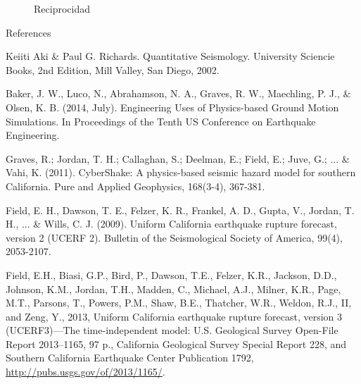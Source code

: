 \documentclass{beamer}
\begin{document}
\begin{frame}[allowframebreaks]
%
\begin{figure}[h]
\centering
	\qquad
\caption{Reciprocidad}
%
\end{figure}
%
%
\end{frame}
%
%
\begin{frame}[allowframebreaks]{References}
\def\newblock{}
%
%

\begin{thebibliography}{1}

 Keiiti Aki \& Paul G. Richards. {Q}uantitative {S}eismology. University Sciencie Books, 2nd Edition, Mill Valley, San Diego, 2002.

 Baker, J. W., Luco, N., Abrahamson, N. A., Graves, R. W., Maechling, P. J., \& Olsen, K. B. (2014, July). Engineering Uses of Physics-based Ground Motion Simulations. In Proceedings of the Tenth US Conference on Earthquake Engineering.

 Graves, R.; Jordan, T. H.; Callaghan, S.; Deelman, E.; Field, E.; Juve, G.; ... \& Vahi, K. (2011). CyberShake: A physics-based seismic hazard model for southern California. Pure and Applied Geophysics, 168(3-4), 367-381.

 Field, E. H., Dawson, T. E., Felzer, K. R., Frankel, A. D., Gupta, V., Jordan, T. H., ... \& Wills, C. J. (2009). Uniform California earthquake rupture forecast, version 2 (UCERF 2). Bulletin of the Seismological Society of America, 99(4), 2053-2107.

 Field, E.H., Biasi, G.P., Bird, P., Dawson, T.E., Felzer, K.R., Jackson, D.D., Johnson, K.M., Jordan, T.H., Madden, C., Michael, A.J., Milner, K.R., Page, M.T., Parsons, T., Powers, P.M., Shaw, B.E., Thatcher, W.R., Weldon, R.J., II, and Zeng, Y., 2013, Uniform California earthquake rupture forecast, version 3 (UCERF3)—The time-independent model: U.S. Geological Survey Open-File Report 2013–1165, 97 p., California Geological Survey Special Report 228, and Southern California Earthquake Center Publication 1792, \url{http://pubs.usgs.gov/of/2013/1165/}.

\end{thebibliography}

\end{frame}
\end{document}
